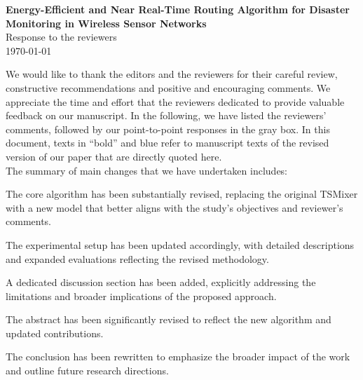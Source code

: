 \documentclass[11pt]{article}
\newcounter{reviewer}
\newcounter{point}[reviewer]
\begin{document}
\begin{center}
\Large
\textbf{Energy-Efficient and Near Real-Time Routing Algorithm for Disaster Monitoring in Wireless Sensor Networks}\\
\vspace{0.5cm}
\large
\vspace{0.25cm}
Response to the reviewers\\
\today
\end{center}
\vspace{2cm}
We would like to thank the editors and the reviewers for their careful review, constructive recommendations and positive and encouraging comments. We appreciate the time and effort that the reviewers dedicated to provide valuable feedback on our manuscript. In the following, we have listed the reviewers' comments, followed by our point-to-point responses in the gray box. In this document, texts in “bold” and blue refer to manuscript texts of the revised version of our paper
that are directly quoted here.\\ 

The summary of main changes that we have undertaken includes:
\begin{description}[leftmargin=!, labelwidth=\widthof{\textbf{Discussion and Limitations}}]
  \item[\textbf{Methodology}] The core algorithm has been substantially revised, replacing the original TSMixer with a new model that better aligns with the study’s objectives and reviewer's comments.

  \item[\textbf{Experiments}] The experimental setup has been updated accordingly, with detailed descriptions and expanded evaluations reflecting the revised methodology.

  \item[\textbf{Discussion and Limitations}] A dedicated discussion section has been added, explicitly addressing the limitations and broader implications of the proposed approach.

  \item[\textbf{Abstract}] The abstract has been significantly revised to reflect the new algorithm and updated contributions.

  \item[\textbf{Conclusion}] The conclusion has been rewritten to emphasize the broader impact of the work and outline future research directions.
\end{description}
\end{document}
